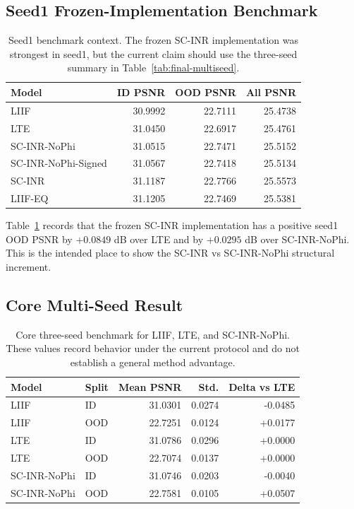 \documentclass[10pt]{article}
\begin{document}
\subsection{Seed1 Frozen-Implementation Benchmark}

\begin{table}[H]
\centering
\caption{Seed1 benchmark context. The frozen SC-INR implementation was strongest in
seed1, but the current claim should use the three-seed summary in
Table~\ref{tab:final-multiseed}.}
\label{tab:seed1}
\begin{tabular}{lrrr}
\toprule
Model & ID PSNR & OOD PSNR & All PSNR \\
\midrule
LIIF & 30.9992 & 22.7111 & 25.4738 \\
LTE & 31.0450 & 22.6917 & 25.4761 \\
SC-INR-NoPhi & 31.0515 & 22.7471 & 25.5152 \\
SC-INR-NoPhi-Signed & 31.0567 & 22.7418 & 25.5134 \\
SC-INR & 31.1187 & 22.7766 & 25.5573 \\
LIIF-EQ & 31.1205 & 22.7469 & 25.5381 \\
\bottomrule
\end{tabular}
\end{table}

Table~\ref{tab:seed1} records that the frozen SC-INR implementation has a positive seed1 OOD
PSNR by \(+0.0849\) dB over LTE and by \(+0.0295\) dB over SC-INR-NoPhi. This
is the intended place to show the SC-INR vs SC-INR-NoPhi structural increment.

\subsection{Core Multi-Seed Result}

\begin{table}[H]
\centering
\caption{Core three-seed benchmark for LIIF, LTE, and SC-INR-NoPhi. These values
record behavior under the current protocol and do not establish a general method advantage.}
\label{tab:multiseed}
\begin{tabular}{llrrr}
\toprule
Model & Split & Mean PSNR & Std. & Delta vs LTE \\
\midrule
LIIF & ID & 31.0301 & 0.0274 & -0.0485 \\
LIIF & OOD & 22.7251 & 0.0124 & +0.0177 \\
LTE & ID & 31.0786 & 0.0296 & +0.0000 \\
LTE & OOD & 22.7074 & 0.0137 & +0.0000 \\
SC-INR-NoPhi & ID & 31.0746 & 0.0203 & -0.0040 \\
SC-INR-NoPhi & OOD & 22.7581 & 0.0105 & +0.0507 \\
\bottomrule
\end{tabular}
\end{table}
\end{document}
